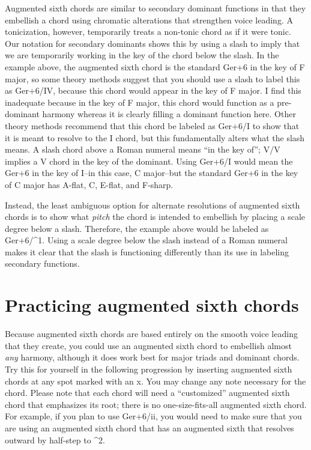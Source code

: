 \documentclass{book}
\begin{document}
Augmented sixth chords are similar to secondary dominant functions in that
they embellish a chord using chromatic alterations that strengthen voice
leading. A tonicization, however, temporarily treats a non-tonic chord as if
it were tonic. Our notation for secondary dominants shows this by using a
slash to imply that we are temporarily working in the key of the chord below
the slash. In the example above, the augmented sixth chord is the standard
Ger+6 in the key of F major, so some theory methods suggest that you should
use a slash to label this as Ger+6/IV, because this chord would appear in the
key of F major. I find this inadequate because in the key of F major, this
chord would function as a pre-dominant harmony whereas it is clearly filling a
dominant function here. Other theory methods recommend that this chord be
labeled as Ger+6/I to show that it is meant to resolve to the I chord, but
this fundamentally alters what the slash means. A slash chord above a Roman
numeral means ``in the key of''; V/V implies a V chord in the key of the
dominant. Using Ger+6/I would mean the Ger+6 in the key of I--in this case, C
major--but the standard Ger+6 in the key of C major has A-flat, C, E-flat, and
F-sharp.

Instead, the least ambiguous option for alternate resolutions of augmented
sixth chords is to show what \emph{pitch} the chord is intended to embellish
by placing a scale degree below a slash. Therefore, the example above would be
labeled as Ger+6/\^{}1. Using a scale degree below the slash instead of a
Roman numeral makes it clear that the slash is functioning differently than
its use in labeling secondary functions.

\hypertarget{practicing-augmented-sixth-chords}{%
\section{Practicing augmented sixth
chords}\label{practicing-augmented-sixth-chords}}

Because augmented sixth chords are based entirely on the smooth voice leading
that they create, you could use an augmented sixth chord to embellish almost
\emph{any} harmony, although it does work best for major triads and dominant
chords. Try this for yourself in the following progression by inserting
augmented sixth chords at any spot marked with an x. You may change any note
necessary for the chord. Please note that each chord will need a
``customized'' augmented sixth chord that emphasizes its root; there is no
one-size-fits-all augmented sixth chord. For example, if you plan to use
Ger+6/ii, you would need to make sure that you are using an augmented sixth
chord that has an augmented sixth that resolves outward by half-step to \^{}2.
\end{document}
